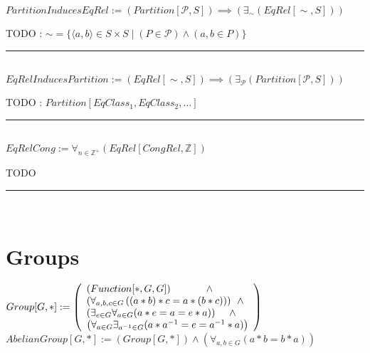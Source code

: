 \documentclass{book}
\newcommand{\abr}{:=}
\newcommand{\pr}[1]{\left(#1\right)}
\newcommand{\st}{\mathbin{|}}
\begin{document}
$PartitionInducesEqRel \abr (Partition[\mathcal{P}, S]) \implies \pr{\exists_{\sim}(EqRel[\sim, S])}$
\begin{enumerate}
  \lit TODO : $\sim = \{\langle a, b \rangle \in S \times S \st (P \in \mathcal{P}) \land (a, b \in P)\}$
\end{enumerate} \vspace{.75mm} \hrule \vspace{.75mm} \ \\ 

$EqRelInducesPartition \abr (EqRel[\sim, S]) \implies \pr{\exists_{\mathcal{P}}(Partition[\mathcal{P}, S])}$
\begin{enumerate}
  \lit TODO : $Partition[EqClass_1, EqClass_2, \ldots]$
\end{enumerate} \vspace{.75mm} \hrule \vspace{.75mm} \ \\ 

$EqRelCong \abr \forall_{n \in \mathbb{Z}^+}(EqRel[CongRel, \mathbb{Z}])$
\begin{enumerate}
  \lit TODO
\end{enumerate} \vspace{.75mm} \hrule \vspace{.75mm} \ \\ 


\section{Groups}
$Group[G, *] \abr \left(\begin{array}{ll}
  (Function[*, G, G]) \hfill \land \hfill \\  %
  \pr{\forall_{a, b, c \in G}\pr{(a * b) * c = a * (b * c)}} \hfill \land \hfill \\  %
  \pr{\exists_{e \in G} \forall_{a \in G}(a * e = a = e * a)} \hfill \land \hfill \\  %
  \pr{\forall_{a \in G} \exists_{a^{-1} \in G}(a * a^{-1} = e = a^{-1} * a)}
\end{array}\right)$ \\
$AbelianGroup[G, *] \abr (Group[G, *]) \land \pr{\forall_{a, b \in G}(a * b = b * a)}$ \\
\end{document}
